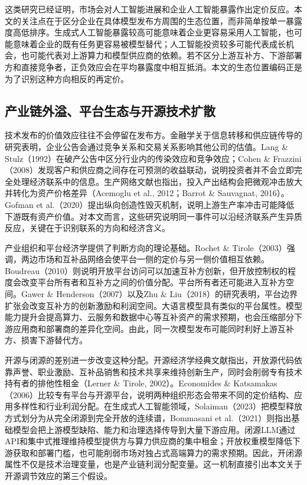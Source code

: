 \documentclass[11pt,fontset=fandol,a4paper]{ctexart}
\begin{document}
这类研究已经证明，市场会对人工智能进展和企业人工智能暴露作出定价反应。本文的关注点在于区分企业在具体模型发布方周围的生态位置，而非简单按单一暴露度高低排序。生成式人工智能暴露较高可能意味着企业更容易采用人工智能，也可能意味着企业的既有任务更容易被模型替代；人工智能投资较多可能代表成长机会，也可能代表对上游算力和模型供应商的依赖。若不区分上游互补方、下游部署方和直接竞争者，正负效应会在平均暴露度中相互抵消。本文的生态位置编码正是为了识别这种方向相反的再定价。

\subsection{产业链外溢、平台生态与开源技术扩散}

技术发布的价值效应往往不会停留在发布方。金融学关于信息转移和供应链传导的研究表明，企业公告会通过竞争关系和交易关系影响其他公司的估值。Lang \& Stulz（1992）在破产公告中区分行业内的传染效应和竞争效应；Cohen \& Frazzini（2008）发现客户和供应商之间存在可预测的收益联动，说明投资者并不会立即完全处理经济联系中的信息。生产网络文献也指出，投入产出结构会把微观冲击放大并转化为资产价格差异（Acemoglu et al., 2012；Barrot \& Sauvagnat, 2016）。Gofman et al.（2020）提出纵向创造性毁灭机制，说明上游生产率冲击可能降低下游既有资产价值。对本文而言，这些研究说明同一事件可以沿经济联系产生异质反应，关键在于识别联系的方向和经济含义。

产业组织和平台经济学提供了判断方向的理论基础。Rochet \& Tirole（2003）强调，两边市场和互补品网络会使平台一侧的定价与另一侧价值相互依赖。Boudreau（2010）则说明开放平台访问可以加速互补方创新，但开放控制权的程度会改变平台所有者和互补方之间的价值分配。平台所有者还可能进入互补方空间。Gawer \& Henderson（2007）以及Zhu \& Liu（2018）的研究表明，平台边界扩张会改变互补方的创新激励和利润空间。大语言模型具有类似的平台属性。模型能力提升会提高算力、云服务和数据中心等互补资产的需求预期，也会压缩部分下游应用商和部署商的差异化空间。由此，同一次模型发布可能同时利好上游互补方、损害下游替代方。

开源与闭源的差别进一步改变这种分配。开源经济学经典文献指出，开放源代码依靠声誉、职业激励、互补品销售和技术共享来维持创新生产，同时会削弱专有技术持有者的排他性租金（Lerner \& Tirole, 2002）。Economides \& Katsamakas（2006）比较专有平台与开源平台，说明两种组织形态会带来不同的定价结构、应用多样性和行业利润分配。在生成式人工智能领域，Solaiman（2023）把模型释放方式划分为从完全闭源到完全开放的连续谱，Bommasani et al.（2021）则指出基础模型会把上游模型缺陷、能力和治理选择传导到大量下游应用。闭源LLM通过API和集中式推理维持模型提供方与算力供应商的集中租金；开放权重模型降低下游获取和部署门槛，也可能削弱市场对独占式高端算力的需求预期。因此，开闭源属性不仅是技术治理变量，也是产业链利润分配变量。这一机制直接引出本文关于开源调节效应的第三个假设。
\end{document}
